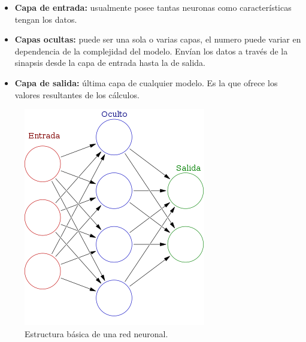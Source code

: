 \begin{itemize}
    \item \textbf{Capa de entrada:} usualmente posee tantas neuronas como características tengan los datos.
    \item \textbf{Capas ocultas:} puede ser una sola o varias capas, el numero puede variar en dependencia de la complejidad del modelo. Envían los datos a través de la sinapsis desde la capa de entrada hasta la de salida.
    \item \textbf{Capa de salida:} última capa de cualquier modelo. Es la que ofrece los valores resultantes de los cálculos.
\end{itemize}

\begin{figure}[h]
    \centering
    \includegraphics[width=.6\linewidth]{Images/neural_network.png}
    \caption{Estructura básica de una red neuronal.}
    \label{fig:neural_network}
\end{figure}

